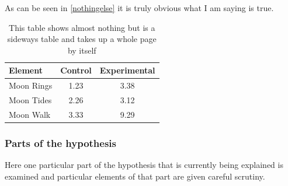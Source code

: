 As can be seen in \autoref{nothingelse} it is
truly obvious what I am saying is true.

\begin{landscape}
    \hfill
    \vfill
    \begin{table}[h!] \centering
        \caption{This table shows almost nothing but is a
            sideways table and takes up a whole page by itself}
        \label{nothingelse}
        \begin{tabular}{lcc} \hline
            \textbf{Element} & \textbf{Control} & \textbf{Experimental} \\ \hline
            Moon Rings       & 1.23             & 3.38                  \\
            Moon Tides       & 2.26             & 3.12                  \\
            Moon Walk        & 3.33             & 9.29                  \\ \hline
        \end{tabular}
    \end{table}
    \hfill
    \vfill
\end{landscape}

\subsubsection{Parts of the hypothesis}

Here one particular part of the hypothesis that is
currently being explained is examined and particular
elements of that part are given careful scrutiny.


